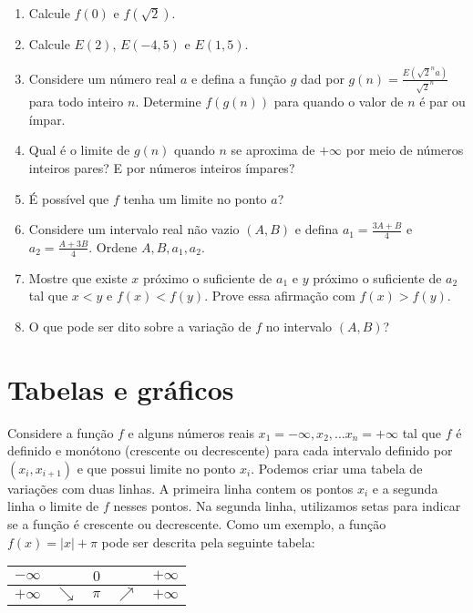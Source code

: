 \begin{enumerate}
\item Calcule $f(0)$ e $f(\sqrt{2})$.
\item Calcule $E(2)$, $E(-4,5)$ e $E(1,5)$.
\item Considere um número real $a$ e defina a função $g$ dad por
  $g(n) = \frac{E(\sqrt{2}^n a)}{\sqrt{2}^n}$ para todo inteiro $n$.
  Determine $f(g(n))$ para quando o valor de $n$ é par ou ímpar.
\item Qual é o limite de $g(n)$ quando $n$ se aproxima de $+\infty$ por meio de
  números inteiros pares? E por números inteiros ímpares?
\item É possível que $f$ tenha um limite no ponto $a$?
\item Considere um intervalo real não vazio $(A, B)$ e
  defina $a_1 = \frac{3A+B}{4}$ e $a_2 = \frac{A+3B}{4}$.
  Ordene $A,B,a_1,a_2$.
\item Mostre que existe $x$ próximo o suficiente de $a_1$ e
  $y$ próximo o suficiente de $a_2$ tal que
  $x < y$ e $f(x) < f(y)$.
  Prove essa afirmação com $f(x) > f(y)$.
\item O que pode ser dito sobre a variação de $f$ no intervalo $(A,B)$?
\end{enumerate}

\section{Tabelas e gráficos}

Considere a função $f$ e alguns números reais
$x_1 = -\infty, x_2, \ldots x_n = +\infty$
tal que $f$ é definido e monótono (crescente ou decrescente) para cada intervalo
definido por $(x_i, x_{i+1})$ e que possui limite no ponto $x_i$.
Podemos criar uma tabela de variações com duas linhas.
A primeira linha contem os pontos $x_i$ e a segunda linha o limite de $f$
nesses pontos. Na segunda linha, utilizamos setas para indicar se a função é
crescente ou decrescente. Como um exemplo, a função
$f(x) = {|x|} + \pi$
pode ser descrita pela seguinte tabela:

\begin{center}
  \begin{tabular}{|c c c c c|}
    \hline
    $-\infty$ & & $0$   &  & $+\infty$ \\
    \hline
    $+\infty$ & $\searrow$ & $\pi$ & $\nearrow$ & $+\infty$ \\
    \hline
  \end{tabular}
\end{center}

